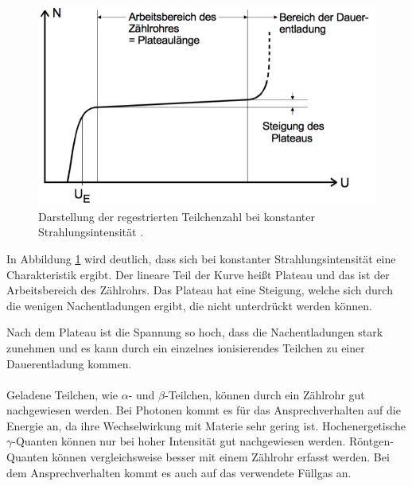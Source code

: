 \begin{figure}[H]
  \centering
  \includegraphics[width=\textwidth]{content/Plateau.png}
  \caption{Darstellung der regestrierten Teilchenzahl bei konstanter Strahlungsintensität
  \cite{1}.}
  \label{abb:4}
\end{figure}

In Abbildung \ref{abb:4} wird deutlich, dass sich bei konstanter Strahlungsintensität
eine Charakteristik ergibt. Der lineare Teil der Kurve heißt Plateau und das ist der
Arbeitsbereich des Zählrohrs. Das Plateau hat eine Steigung, welche sich durch die wenigen
Nachentladungen ergibt, die nicht unterdrückt werden können.

Nach dem Plateau ist die Spannung so hoch, dass die Nachentladungen stark zunehmen
und es kann durch ein einzelnes ionisierendes Teilchen zu einer Dauerentladung kommen.
\\\\

Geladene Teilchen, wie $\alpha$- und $\beta$-Teilchen, können durch ein Zählrohr
gut nachgewiesen werden. Bei Photonen kommt es für das Ansprechverhalten auf die
Energie an, da ihre Wechselwirkung mit Materie sehr gering ist. Hochenergetische
$\gamma$-Quanten können nur bei hoher Intensität gut nachgewiesen werden. Röntgen-Quanten
können vergleichsweise besser mit einem Zählrohr erfasst werden. Bei dem Ansprechverhalten
kommt es auch auf das verwendete Füllgas an.
